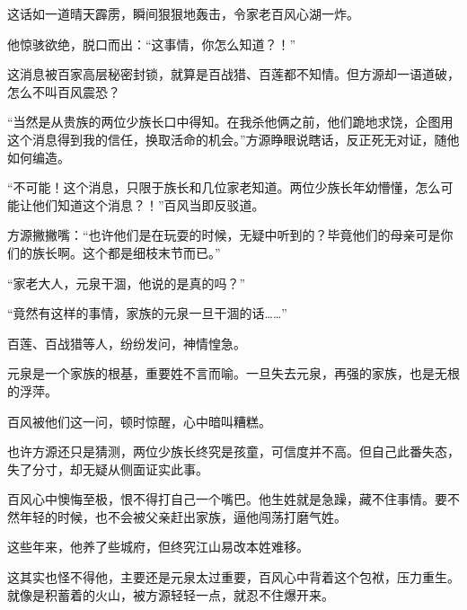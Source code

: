 \begin{this_body}
这话如一道晴天霹雳，瞬间狠狠地轰击，令家老百风心湖一炸。

他惊骇欲绝，脱口而出：“这事情，你怎么知道？！”

这消息被百家高层秘密封锁，就算是百战猎、百莲都不知情。但方源却一语道破，怎么不叫百风震恐？

“当然是从贵族的两位少族长口中得知。在我杀他俩之前，他们跪地求饶，企图用这个消息得到我的信任，换取活命的机会。”方源睁眼说瞎话，反正死无对证，随他如何编造。

“不可能！这个消息，只限于族长和几位家老知道。两位少族长年幼懵懂，怎么可能让他们知道这个消息？！”百风当即反驳道。

方源撇撇嘴：“也许他们是在玩耍的时候，无疑中听到的？毕竟他们的母亲可是你们的族长啊。这个都是细枝末节而已。”

“家老大人，元泉干涸，他说的是真的吗？”

“竟然有这样的事情，家族的元泉一旦干涸的话……”

百莲、百战猎等人，纷纷发问，神情惶急。

元泉是一个家族的根基，重要姓不言而喻。一旦失去元泉，再强的家族，也是无根的浮萍。

百风被他们这一问，顿时惊醒，心中暗叫糟糕。

也许方源还只是猜测，两位少族长终究是孩童，可信度并不高。但自己此番失态，失了分寸，却无疑从侧面证实此事。

百风心中懊悔至极，恨不得打自己一个嘴巴。他生姓就是急躁，藏不住事情。要不然年轻的时候，也不会被父亲赶出家族，逼他闯荡打磨气姓。

这些年来，他养了些城府，但终究江山易改本姓难移。

这其实也怪不得他，主要还是元泉太过重要，百风心中背着这个包袱，压力重生。就像是积蓄着的火山，被方源轻轻一点，就忍不住爆开来。

\end{this_body}

